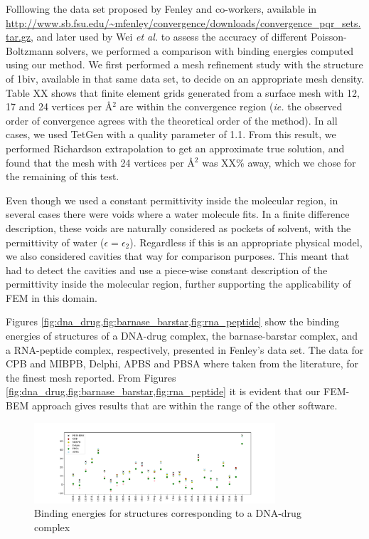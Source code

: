 Folllowing the data set proposed by Fenley and co-workers,\cite{HarrisBoschitcshFenley2013} available in \url{http://www.sb.fsu.edu/~mfenley/convergence/downloads/convergence_pqr_sets.tar.gz}, and later used by Wei {\it et al.}\cite{} to assess the accuracy of different Poisson-Boltzmann solvers, we performed a comparison with binding energies computed using our method. 
We first performed a mesh refinement study with the structure of 1biv, available in that same data set, to decide on an appropriate mesh density.
Table XX shows that finite element grids generated from a surface mesh with 12, 17 and 24 vertices per \AA$^2$ are within the convergence region ({\it ie.} the observed order of convergence agrees with the theoretical order of the method).\cite{Roache1998,CooperBardhanBarba2014}
In all cases, we used TetGen with a quality parameter of 1.1.
From this result, we performed Richardson extrapolation to get an approximate true solution, and found that the mesh with 24 vertices per \AA$^2$ was XX\% away, which we chose for the remaining of this test.

Even though we used a constant permittivity inside the molecular region, in several cases there were voids where a water molecule fits. 
In a finite difference description, these voids are naturally considered as pockets of solvent, with the permittivity of water ($\epsilon=\epsilon_2$).
Regardless if this is an appropriate physical model, we also considered cavities that way for comparison purposes.
This meant that had to detect the cavities and use a piece-wise constant description of the permittivity inside the molecular region, further supporting the applicability of FEM in this domain.

Figures \ref{fig:dna_drug,fig:barnase_barstar,fig:rna_peptide} show the binding energies of structures of a DNA-drug complex, the barnase-barstar complex, and a RNA-peptide complex, respectively, presented in Fenley's data set.\cite{HarrisBoschitcshFenley2013} The data for CPB\cite{HarrisBoschitcshFenley2013} and MIBPB, Delphi, APBS and PBSA where taken from the literature,\cite{Nguyen} for the finest mesh reported. From Figures \ref{fig:dna_drug,fig:barnase_barstar,fig:rna_peptide} it is evident that our FEM-BEM approach gives results that are within the range of the other software.

\begin{figure}
\centering
\includegraphics[width=0.8\textwidth]{binding_energy_dna-drug.pdf}
\caption{Binding energies for structures corresponding to a DNA-drug complex}
\label{fig:dna_drug}
\end{figure}

